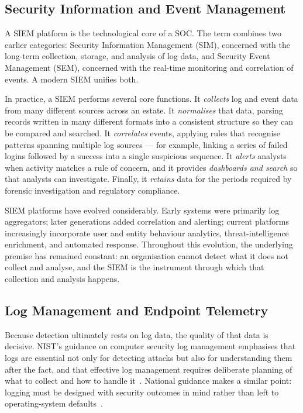 \subsection{Security Information and Event Management}

A SIEM platform is the technological core of a SOC. The term combines two
earlier categories: Security Information Management (SIM), concerned with the
long-term collection, storage, and analysis of log data, and Security Event
Management (SEM), concerned with the real-time monitoring and correlation of
events. A modern SIEM unifies both.

In practice, a SIEM performs several core functions. It \textit{collects} log
and event data from many different sources across an estate. It
\textit{normalises} that data, parsing records written in many different
formats into a consistent structure so they can be compared and searched. It
\textit{correlates} events, applying rules that recognise patterns spanning
multiple log sources --- for example, linking a series of failed logins
followed by a success into a single suspicious sequence. It \textit{alerts}
analysts when activity matches a rule of concern, and it provides
\textit{dashboards and search} so that analysts can investigate. Finally, it
\textit{retains} data for the periods required by forensic investigation and
regulatory compliance.

SIEM platforms have evolved considerably. Early systems were primarily log
aggregators; later generations added correlation and alerting; current
platforms increasingly incorporate user and entity behaviour analytics,
threat-intelligence enrichment, and automated response. Throughout this
evolution, the underlying premise has remained constant: an organisation
cannot detect what it does not collect and analyse, and the SIEM is the
instrument through which that collection and analysis happens.

\subsection{Log Management and Endpoint Telemetry}

Because detection ultimately rests on log data, the quality of that data is
decisive. NIST's guidance on computer security log management emphasises that
logs are essential not only for detecting attacks but also for understanding
them after the fact, and that effective log management requires deliberate
planning of what to collect and how to handle it~\cite{nist80092}. National
guidance makes a similar point: logging must be designed with security
outcomes in mind rather than left to operating-system defaults~\cite{ncsc}.

